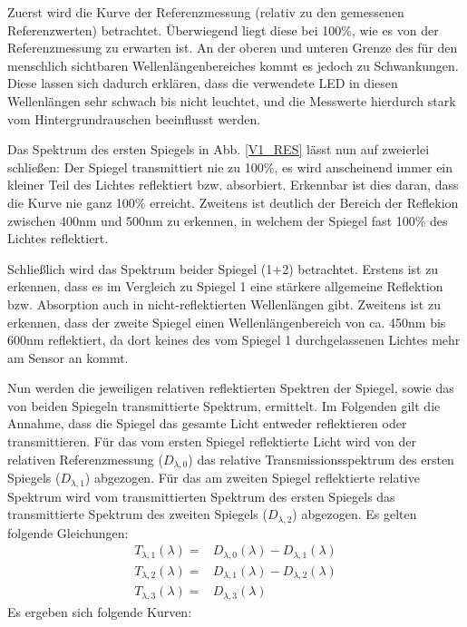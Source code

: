 \label{V1_AUSW}

Zuerst wird die Kurve der Referenzmessung (relativ zu den gemessenen Referenzwerten) betrachtet. Überwiegend liegt diese bei 100\%, wie es von der Referenzmessung zu erwarten ist. An der oberen und unteren Grenze des für den menschlich sichtbaren Wellenlängenbereiches kommt es jedoch zu Schwankungen. Diese lassen sich dadurch erklären, dass die verwendete LED in diesen Wellenlängen sehr schwach bis nicht leuchtet, und die Messwerte hierdurch stark vom Hintergrundrauschen beeinflusst werden. 

Das Spektrum des ersten Spiegels in Abb. \ref{V1_RES} lässt nun auf zweierlei schließen:
Der Spiegel transmittiert nie zu 100\%, es wird anscheinend immer ein kleiner Teil des Lichtes reflektiert bzw. absorbiert. Erkennbar ist dies daran, dass die Kurve nie ganz 100\% erreicht. Zweitens ist deutlich der Bereich der Reflekion zwischen 400nm und 500nm zu erkennen, in welchem der Spiegel fast 100\% des Lichtes reflektiert. 

Schließlich wird das Spektrum beider Spiegel (1+2) betrachtet. Erstens ist zu erkennen, dass es im Vergleich zu Spiegel 1 eine stärkere allgemeine Reflektion bzw. Absorption auch in nicht-reflektierten Wellenlängen gibt. Zweitens ist zu erkennen, dass der zweite Spiegel einen Wellenlängenbereich von ca. 450nm bis 600nm reflektiert, da dort keines des vom Spiegel 1 durchgelassenen Lichtes mehr am Sensor an kommt.

Nun werden die jeweiligen relativen reflektierten Spektren der Spiegel, sowie das von beiden Spiegeln transmittierte Spektrum, ermittelt.
Im Folgenden gilt die Annahme, dass die Spiegel das gesamte Licht entweder reflektieren oder transmittieren.
Für das vom ersten Spiegel reflektierte Licht wird von der relativen Referenzmessung ($D_{\lambda,0}$) das relative Transmissionsspektrum des ersten Spiegels ($D_{\lambda,1}$) abgezogen.
Für das am zweiten Spiegel reflektierte relative Spektrum wird vom transmittierten Spektrum des ersten Spiegels das transmittierte Spektrum des zweiten Spiegels ($D_{\lambda,2}$) abgezogen. Es gelten folgende Gleichungen:
\begin{eqnarray*}
	T_{\lambda, 1}(\lambda) = & D_{\lambda,0}(\lambda) - D_{\lambda,1}(\lambda) \\
	T_{\lambda, 2}(\lambda) = & D_{\lambda,1}(\lambda) - D_{\lambda,2}(\lambda) \\
	T_{\lambda, 3}(\lambda) = & D_{\lambda,3}(\lambda)
\end{eqnarray*}
Es ergeben sich folgende Kurven:

